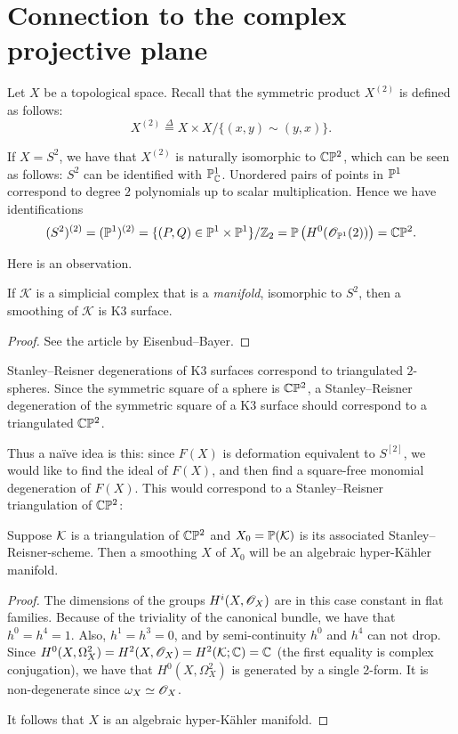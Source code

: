 \section{Connection to the complex projective plane}

Let $X$ be a topological space. Recall that the symmetric product $X^{(2)}$ is defined as follows:
\[
X^{(2)} \stackrel\Delta = X \times X / \{ (x,y) \sim (y,x) \}.
\]

If $X=S^2$, we have that $X^{(2)}$ is naturally isomorphic to $\C \P^2$, which can be seen as follows: $S^2$ can be identified with $\P^1_\C$. Unordered pairs of points in $\P^1$ correspond to degree $2$ polynomials up to scalar multiplication. Hence we have identifications
$$
(S^2)^{(2)} = (\P^1)^{(2)} = \{ (P,Q) \in \P^1 \times \P^1 \} / \Z_2 = \P\left( H^0(\OO_{\P^1}(2)) \right)=\C \P^2.
$$

Here is an observation.

\begin{lemma}
If $\mathcal K$ is a simplicial complex that is a \emph{manifold}, isomorphic to $S^2$, then a smoothing of $\mathcal K$ is K3 surface.
\end{lemma}
\begin{proof}
See the article \cite{eisenbud_graphcurves} by Eisenbud--Bayer.
\end{proof}

Stanley--Reisner degenerations of K3 surfaces correspond to triangulated $2$-spheres. Since the symmetric square of a sphere is $\C \P ^2$, a Stanley--Reisner degeneration of the symmetric square of a K3 surface should correspond to a triangulated $\C \P^2$. 

Thus a naïve idea is this: since $F(X)$ is deformation equivalent to $S^{[2]}$, we would like to find the ideal of $F(X)$, and then find a square-free monomial degeneration of $F(X)$. This would correspond to a Stanley--Reisner triangulation of $\C \P^2$:

\begin{proposition}
Suppose $\K$ is a triangulation of $\C \P^2$ and $X_0=\P(\K)$ is its associated Stanley--Reisner-scheme. Then a smoothing $X$ of $X_0$ will be an algebraic hyper-Kähler manifold.
\end{proposition}
\begin{proof}
The dimensions of the groups $H^i(X,\OO_X)$ are in this case constant in flat families. Because of the triviality of the canonical bundle, we have that $h^0=h^4=1$. Also, $h^1=h^3=0$, and by semi-continuity $h^0$ and $h^4$ can not drop. Since $H^0(X,\Omega^2_X)=H^2(X,\OO_X)=H^2(\K;\C)=\C$ (the first equality is complex conjugation), we have that $H^0(X,\Omega^2_X)$ is generated by a single 2-form. It is non-degenerate since $\omega_X \simeq \OO_X$.

It follows that $X$ is an algebraic hyper-Kähler manifold.
\end{proof}

